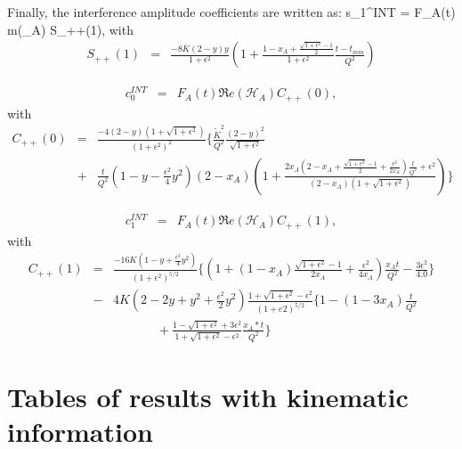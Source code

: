 \documentclass{article}
\let\oldequation\equation
\let\oldendequation\endequation
\renewenvironment{equation}
  {\linenomathNonumbers\oldequation}
  {\oldendequation\endlinenomath}
\begin{document}
Finally, the interference amplitude coefficients are written as:
\begin{equation}
s_{1}^{INT} = F_{A}(t) \Im m(_{A}) S_{++}(1),
\end{equation}
with
\begin{eqnarray}
   S_{++}(1) &=& \frac{-8K(2-y)y}{1+\epsilon^2} \left( 1 + 
\frac{1-x_A+\frac{\sqrt{1+\epsilon^2}-1}{2}}{1+\epsilon^2} 
\frac{t-t_{min}}{Q^{2}} \right) \label{eq:s1I}
\end{eqnarray}

\begin{eqnarray}
c_0^{INT} &=& F_A(t) \Re e(\mathcal{H}_{A}) C_{++}(0),
\end{eqnarray}
with \begin{eqnarray}  C_{++}(0) &=&
\frac{-4(2-y)(1+\sqrt{1+\epsilon^{2}})}{(1+\epsilon^{2})^2}  \bigg\{ 
   \frac{\widetilde{K}^2}{Q^2}  \frac{(2-y)^2}{\sqrt{1+\epsilon^{2}}} \, \\
   &+& \frac{t}{Q^2}  \left( 1 - y - \frac{\epsilon^2}{4} y^2 \right)  
(2-x_{A}) \left(  1 + \frac{2x_A(2-x_A + \frac{\sqrt{1+\epsilon^{2}}-1}{2} + 
\frac{\epsilon^{2}}{2x_A})\frac{t}{Q^2} + \epsilon^{2}}{(2-x_A) 
(1+\sqrt{1+\epsilon^{2}})}  \right)  \bigg\} \nonumber
 \label{eq:c0I} 
 \end{eqnarray}

\begin{eqnarray}
   c_1^{INT} &=&  F_A(t) \Re e(\mathcal{H}_{A}) C_{++}(1),
\end{eqnarray}
with  
   \begin{eqnarray}
   C_{++}(1) &=&
   \frac{-16K(1-y+\frac{\epsilon^{2}}{4}y^2)}{(1+\epsilon^{2})^{5/2}}\bigg\{\left(1+(1-x_A)\frac{\sqrt{1+\epsilon^{2}}-1}{2x_A} 
   + \frac{\epsilon^{2}}{4x_A}\right) 
\frac{x_At}{Q^2}-\frac{3\epsilon^{2}}{4.0} \bigg\} \nonumber \\&-& 4K \left( 
2-2y+y^2+\frac{\epsilon^{2}}{2}y^2\right)\frac{1+\sqrt{1+\epsilon^{2}}-\epsilon^{2}}{(1+e2)^{5/2}}\bigg\{1-(1-3x_A)\frac{t}{Q^2}\nonumber\\&\,\,\,\,&\,\,\,\,\,\,\,\,\,\,\,\,\,\,\,\,\,\,\,\,\,+\frac{1-\sqrt{1+\epsilon^{2}}+3\epsilon^{2}}{1+\sqrt{1+\epsilon^{2}}-\epsilon^{2}} 
\frac{x_A*t}{Q^2}\bigg\} \label{eq:c1I}
\end{eqnarray}


\section{Tables of results with kinematic information}
\label{sec:fullresults}
\end{document}
